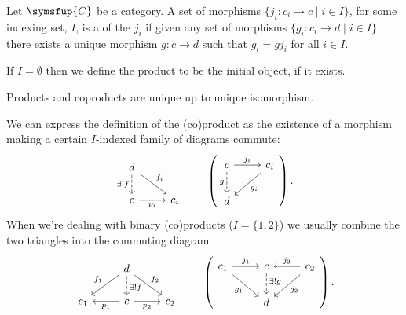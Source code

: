 \documentclass[fleqn]{NotesClass}
\newcommand{\cat}[1]{\symsfup{#1}}
\begin{document}
    \begin{dfn}{}{}
        Let \(\cat{C}\) be a category.
        A set of morphisms \(\{j_i \colon c_i \to c \mid i \in I\}\), for some indexing set, \(I\), is a  of the \(j_i\) if given any set of morphisms \(\{g_i \colon c_i \to d \mid i \in I\}\) there exists a unique morphism \(g \colon c \to d\) such that \(g_i = g j_i\) for all \(i \in I\).
        
        If \(I = \emptyset\) then we define the product to be the initial object, if it exists.
    \end{dfn}
    
    \begin{lma}{}{}
        Products and coproducts are unique up to unique isomorphism.
    \end{lma}
    
    We can express the definition of the (co)product as the existence of a morphism making a certain \(I\)-indexed family of diagrams commute:
    \begin{equation}
        \begin{tikzcd}
            d \arrow[d, dashed, "\exists ! f"'] \arrow[dr, "f_i"]\\
            c \arrow[r, "p_i"'] & c_i
        \end{tikzcd}
        \qquad \left(
            \begin{tikzcd}
                c \arrow[r, "j_i"] \arrow[d, dashed, "g"'] & c_i \arrow[dl, "g_i"]\\
                d
            \end{tikzcd}
        \right).
    \end{equation}
    When we're dealing with binary (co)products (\(I = \{1, 2\}\)) we usually combine the two triangles into the commuting diagram
    \begin{equation}
        \begin{tikzcd}
            & d \arrow[dl, "f_1"'] \arrow[dr, "f_2"] \arrow[d, dashed, "\exists ! f", pos=0.6]\\
            c_1 & c \arrow[l, "p_1"] \arrow[r, "p_2"'] & c_2
        \end{tikzcd}
        \qquad \left(
            \begin{tikzcd}
                c_1 \arrow[r, "j_1"] \arrow[dr, "g_1"'] & c \arrow[d, dashed, "\exists ! g", pos=0.4] & c_2 \arrow[l, "j_2"'] \arrow[dl, "g_2"]\\
                & d
            \end{tikzcd}
        \right).
    \end{equation}
    
\end{document}
